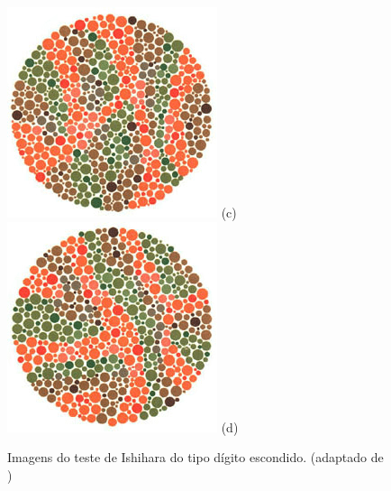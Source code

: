 \documentclass[	12pt, Times, openright, twoside, a4paper, english, brazil]{abntex2}
\begin{document}
\begin{apendicesenv}
\begin{figure}[!htb]
\centering
{\includegraphics[width=\linewidth]{ishihara-digitoescondido/plate20.jpg}}
(c)
\endminipage\hfill
{}
\centering
{\includegraphics[width=\linewidth]{ishihara-digitoescondido/plate21.jpg}}
(d)
\endminipage\hfill
\caption{Imagens do teste de Ishihara do tipo dígito escondido. (adaptado de )}
\label{fig:apendiceDigitoEscondido}
\end{figure}


\end{apendicesenv}
\end{document}

